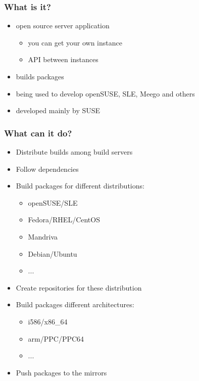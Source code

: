 
\begin{frame}[t]
   \frametitle{What is it?}
   \begin{itemize}
      \item open source server application
      \begin{itemize}
         \item you can get your own instance
         \item API between instances
      \end{itemize}
      \item builds packages
      \item being used to develop openSUSE, SLE, Meego and others
      \item developed mainly by SUSE
   \end{itemize}
\end{frame}

\begin{frame}[t]
   \frametitle{What can it do?}
   \begin{itemize}
      \item Distribute builds among build servers
      \item Follow dependencies
      \item Build packages for different distributions:
      \begin{itemize}
         \item openSUSE/SLE
         \item Fedora/RHEL/CentOS
         \item Mandriva
         \item Debian/Ubuntu
         \item ...
      \end{itemize}
      \item Create repositories for these distribution
      \item Build packages different architectures:
      \begin{itemize}
         \item i586/x86\_64
         \item arm/PPC/PPC64
         \item ...
      \end{itemize}
      \item Push packages to the mirrors
   \end{itemize}
\end{frame}

